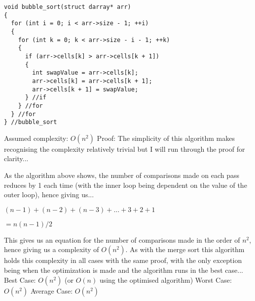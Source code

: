 \documentclass{article}
\begin{document}
\begin{verbatim}
void bubble_sort(struct darray* arr)
{
  for (int i = 0; i < arr->size - 1; ++i)
  {
    for (int k = 0; k < arr->size - i - 1; ++k)
    {
      if (arr->cells[k] > arr->cells[k + 1])
      {
        int swapValue = arr->cells[k];
        arr->cells[k] = arr->cells[k + 1];
        arr->cells[k + 1] = swapValue;
      } //if
    } //for
  } //for
} //bubble_sort
\end{verbatim}

Assumed complexity: \begin{math}O(n^2) \end{math}
\newline\newline\newline
Proof:
\newline
The simplicity of this algorithm makes recognising the complexity relatively trivial but I will run through the proof for clarity...

As the algorithm above shows, the number of comparisons made on each pass reduces by 1 each time (with the inner loop being dependent on the value of the outer loop), hence giving us...
\newline\newline
\centerline{
\begin{math}
(n-1) + (n-2) + (n-3) + ... + 3 + 2 + 1
\end{math}
}
\centerline{
\begin{math}
= n(n-1)/2
\end{math}
}
\newline\newline
This gives us an equation for the number of comparisons made in the order of \begin{math}n^2\end{math}, hence giving us a complexity of \begin{math}O(n^2)\end{math}.
\newline
As with the merge sort this algorithm holds this complexity in all cases with the same proof, with the only exception being when the optimization is made and the algorithm runs in the best case...
\newline\newline
Best Case: \begin{math}O(n^2)\end{math} (or \begin{math}O(n)\end{math} using the optimised algorithm)
\newline\newline
Worst Case: \begin{math}O(n^2)\end{math}
\newline\newline
Average Case: \begin{math}O(n^2)\end{math}
\newline
\end{document}
